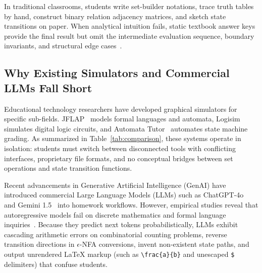 \documentclass[conference]{IEEEtran}
\begin{document}
In traditional classrooms, students write set-builder notations, trace truth tables by hand, construct binary relation adjacency matrices, and sketch state transitions on paper. When analytical intuition fails, static textbook answer keys provide the final result but omit the intermediate evaluation sequence, boundary invariants, and structural edge cases~\cite{alqasemi2024, kumar2023}.

\subsection{Why Existing Simulators and Commercial LLMs Fall Short}
Educational technology researchers have developed graphical simulators for specific sub-fields. JFLAP~\cite{rodger2006} models formal languages and automata, Logisim~\cite{burch2002} simulates digital logic circuits, and Automata Tutor~\cite{dantoni2020} automates state machine grading. As summarized in Table~\ref{tab:comparison}, these systems operate in isolation: students must switch between disconnected tools with conflicting interfaces, proprietary file formats, and no conceptual bridges between set operations and state transition functions.

Recent advancements in Generative Artificial Intelligence (GenAI) have introduced commercial Large Language Models (LLMs) such as ChatGPT-4o~\cite{achiam2023} and Gemini 1.5~\cite{gemini2024} into homework workflows. However, empirical studies reveal that autoregressive models fail on discrete mathematics and formal language inquiries~\cite{alqasemi2024, kumar2023}. Because they predict next tokens probabilistically, LLMs exhibit cascading arithmetic errors on combinatorial counting problems, reverse transition directions in $\epsilon$-NFA conversions, invent non-existent state paths, and output unrendered \LaTeX{} markup (such as \texttt{\textbackslash frac\{a\}\{b\}} and unescaped \texttt{\$} delimiters) that confuse students.
\end{document}
